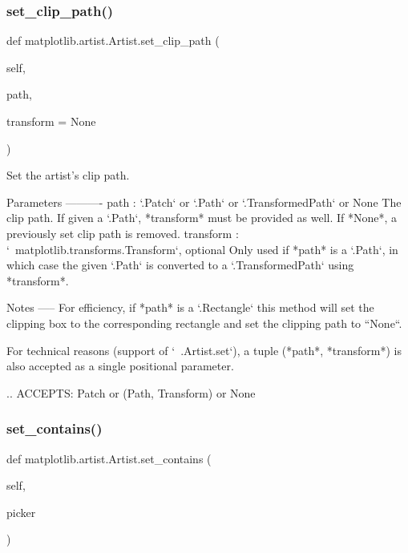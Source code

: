 \subsubsection{\texorpdfstring{set\+\_\+clip\+\_\+path()}{set\_clip\_path()}}
{\footnotesize\ttfamily def matplotlib.\+artist.\+Artist.\+set\+\_\+clip\+\_\+path (\begin{DoxyParamCaption}\item[{}]{self,  }\item[{}]{path,  }\item[{}]{transform = {\ttfamily None} }\end{DoxyParamCaption})}

\begin{DoxyVerb}Set the artist's clip path.

Parameters
----------
path : `.Patch` or `.Path` or `.TransformedPath` or None
    The clip path. If given a `.Path`, *transform* must be provided as
    well. If *None*, a previously set clip path is removed.
transform : `~matplotlib.transforms.Transform`, optional
    Only used if *path* is a `.Path`, in which case the given `.Path`
    is converted to a `.TransformedPath` using *transform*.

Notes
-----
For efficiency, if *path* is a `.Rectangle` this method will set the
clipping box to the corresponding rectangle and set the clipping path
to ``None``.

For technical reasons (support of `~.Artist.set`), a tuple
(*path*, *transform*) is also accepted as a single positional
parameter.

.. ACCEPTS: Patch or (Path, Transform) or None
\end{DoxyVerb}
 \mbox{\label{classmatplotlib_1_1artist_1_1Artist_a0be165ab75ac3fa55a3904b3b6823685}} 
\subsubsection{\texorpdfstring{set\+\_\+contains()}{set\_contains()}}
{\footnotesize\ttfamily def matplotlib.\+artist.\+Artist.\+set\+\_\+contains (\begin{DoxyParamCaption}\item[{}]{self,  }\item[{}]{picker }\end{DoxyParamCaption})}

